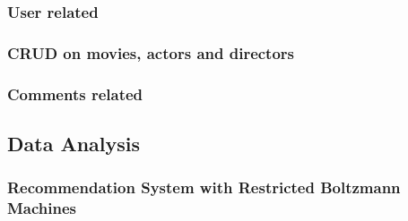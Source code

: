 \begin{CJK*}{UTF8}{gbsn}
\subsubsection{User related}
\subsubsection{CRUD on movies, actors and directors}
\subsubsection{Comments related}
\subsection{Data Analysis}
\subsubsection{Recommendation System with Restricted Boltzmann Machines}


\end{CJK*}
